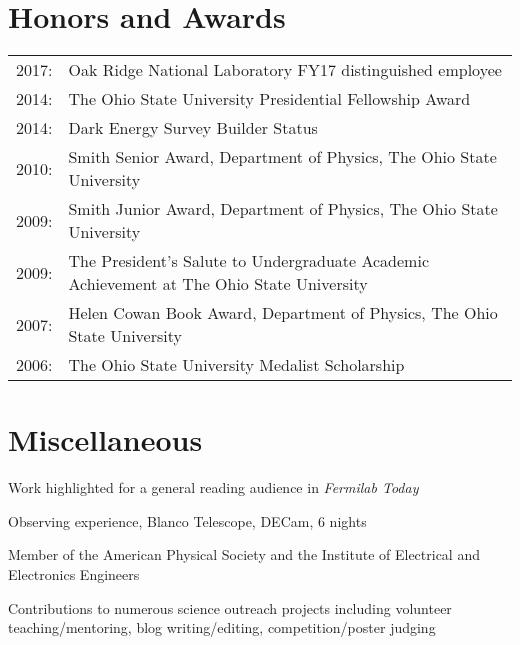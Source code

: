 \documentclass[12pt,a4paper,sans]{moderncv}	%
\begin{document}
\section{Honors and Awards}
\begin{tabularx}{\linewidth}{l X}
2017: & Oak Ridge National Laboratory FY17 distinguished employee \\
2014: & The Ohio State University Presidential Fellowship Award \\
2014: & Dark Energy Survey Builder Status \\
2010: & Smith Senior Award, Department of Physics, The Ohio State University \\
2009: & Smith Junior Award, Department of Physics, The Ohio State University  \\
2009: & The President's Salute to Undergraduate Academic Achievement at The Ohio State University \\
2007: & Helen Cowan Book Award, Department of Physics, The Ohio State University  \\
2006: & The Ohio State University Medalist Scholarship
\end{tabularx}


\section{Miscellaneous}
\begin{achievements}
\item Work highlighted for a general reading audience in \textit{Fermilab Today}
\item Observing experience, Blanco Telescope, DECam, 6 nights
\item Member of the American Physical Society and the Institute of Electrical and Electronics Engineers
\item Contributions to numerous science outreach projects including volunteer teaching/mentoring, blog writing/editing, competition/poster judging
\end{achievements}

\clearpage



\end{document}
